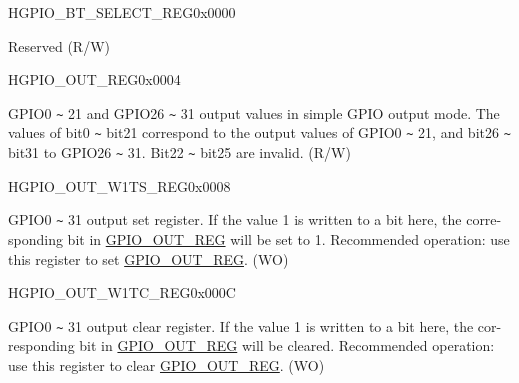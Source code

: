 \begin{register}{H}{GPIO\_BT\_SELECT\_REG}{0x{}0000}\label{regdesc:GPIOBTSELECTREG}
%
\regnewline%
\begin{regdesc}\begin{reglist}
\label{fielddesc:GPIOBTSEL}\item [GPIO\_BT\_SEL] Reserved (R/W)
\end{reglist}\end{regdesc}
\end{register}


\begin{register}{H}{GPIO\_OUT\_REG}{0x{}0004}\label{regdesc:GPIOOUTREG}
%
\regnewline%
\begin{regdesc}\begin{reglist}
\label{fielddesc:GPIOOUTDATAORIG}\item [GPIO\_OUT\_DATA\_ORIG] GPIO0 \verb+~+ 21 and GPIO26 \verb+~+ 31 output values in simple GPIO output mode. The values of bit0 \verb+~+ bit21 correspond to the output values of GPIO0 \verb+~+ 21, and bit26 \verb+~+ bit31 to GPIO26 \verb+~+ 31. Bit22 \verb+~+ bit25 are invalid. (R/W)
\end{reglist}\end{regdesc}
\end{register}


\begin{register}{H}{GPIO\_OUT\_W1TS\_REG}{0x{}0008}\label{regdesc:GPIOOUTW1TSREG}
%
\regnewline%
\begin{regdesc}\begin{reglist}
\label{fielddesc:GPIOOUTW1TS}\item [GPIO\_OUT\_W1TS] GPIO0 \verb+~+ 31 output set register. If the value 1 is written to a bit here, the corre- sponding bit in \hyperref[regdesc:GPIOOUTREG]{GPIO\_OUT\_REG} will be set to 1. Recommended operation: use this register to set \hyperref[regdesc:GPIOOUTREG]{GPIO\_OUT\_REG}. (WO)
\end{reglist}\end{regdesc}
\end{register}


\begin{register}{H}{GPIO\_OUT\_W1TC\_REG}{0x{}000C}\label{regdesc:GPIOOUTW1TCREG}
%
\regnewline%
\begin{regdesc}\begin{reglist}
\label{fielddesc:GPIOOUTW1TC}\item [GPIO\_OUT\_W1TC] GPIO0 \verb+~+ 31 output clear register. If the value 1 is written to a bit here, the cor- responding bit in \hyperref[regdesc:GPIOOUTREG]{GPIO\_OUT\_REG} will be cleared. Recommended operation: use this register to clear \hyperref[regdesc:GPIOOUTREG]{GPIO\_OUT\_REG}. (WO)
\end{reglist}\end{regdesc}
\end{register}


